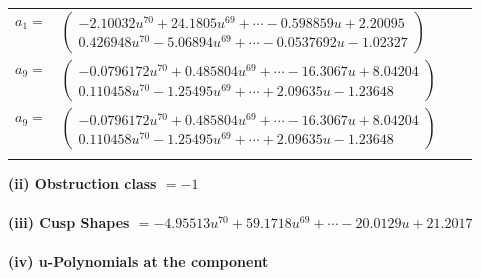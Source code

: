 \documentclass[1p]{elsarticle_modified}
\theoremstyle{definition}
\begin{document}
\begin{tabular}{m{7pt} m{180pt} m{7pt} m{180pt} }
\flushright $a_{1}=$&$\begin{pmatrix}-2.10032 u^{70}+24.1805 u^{69}+\cdots-0.598859 u+2.20095\\0.426948 u^{70}-5.06894 u^{69}+\cdots-0.0537692 u-1.02327\end{pmatrix}$ \\
\flushright $a_{9}=$&$\begin{pmatrix}-0.0796172 u^{70}+0.485804 u^{69}+\cdots-16.3067 u+8.04204\\0.110458 u^{70}-1.25495 u^{69}+\cdots+2.09635 u-1.23648\end{pmatrix}$\\ \flushright $a_{9}=$&$\begin{pmatrix}-0.0796172 u^{70}+0.485804 u^{69}+\cdots-16.3067 u+8.04204\\0.110458 u^{70}-1.25495 u^{69}+\cdots+2.09635 u-1.23648\end{pmatrix}$\\&\end{tabular}
\flushleft \textbf{(ii) Obstruction class $= -1$}\\~\\
\flushleft \textbf{(iii) Cusp Shapes $= -4.95513 u^{70}+59.1718 u^{69}+\cdots-20.0129 u+21.2017$}\\~\\
\newpage\renewcommand{\arraystretch}{1}
\flushleft \textbf{(iv) u-Polynomials at the component}\newline \\
\end{document}
